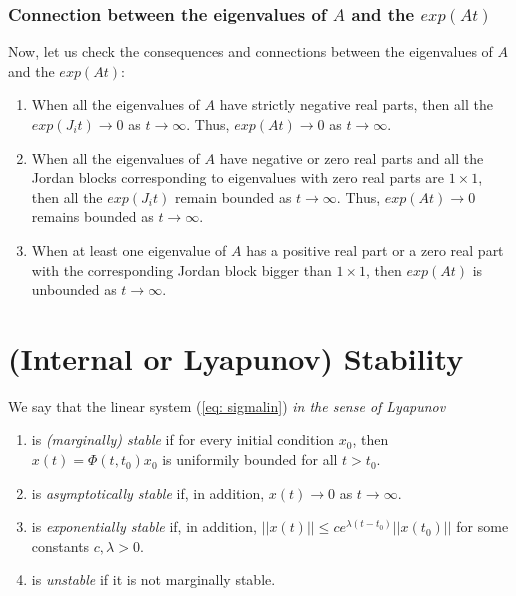 \documentclass[11pt,a4paper,titlepage]{article}
\begin{document}
\subsubsection{Connection between the eigenvalues of $A$ and the $exp(At)$}
Now, let us check the consequences and connections between the eigenvalues of $A$ and the $exp(At)$:
\begin{enumerate}
	\item When all the eigenvalues of $A$ have strictly negative real parts, then all the $exp(J_it) \to 0$ as $t\to\infty$. Thus, $exp(At)\to 0 $ as $t\to\infty$.
	\item When all the eigenvalues of $A$ have negative or zero real parts and all the Jordan blocks corresponding to eigenvalues with zero real parts are $1\times 1$, then all the $exp(J_it)$ remain bounded as $t\to\infty$. Thus, $exp(At)\to 0 $ remains bounded as $t\to\infty$.
	\item When at least one eigenvalue of $A$ has a positive real part or a zero real part with the corresponding Jordan block bigger than $1\times 1$, then $exp(At)$ is unbounded as $t\to\infty$.
\end{enumerate}

\section{(Internal or Lyapunov) Stability}
\label{sec: sta}

We say that the linear system (\ref{eq: sigmalin}) \emph{in the sense of Lyapunov}
\begin{enumerate}
	\item is \emph{(marginally) stable} if for every initial condition $x_0$, then $x(t) = \Phi(t,t_0) x_0$ is uniformily bounded for all $t>t_0$.
	\item is \emph{asymptotically stable} if, in addition, $x(t) \to 0$ as $t\to\infty$.
	\item is \emph{exponentially stable} if, in addition, $||x(t)|| \leq c e^{\lambda(t-t_0)}||x(t_0)||$ for some constants $c,\lambda > 0$.
	\item is \emph{unstable} if it is not marginally stable.
\end{enumerate}

\end{document}

